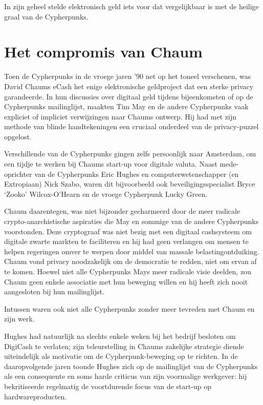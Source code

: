 \documentclass[
  a5paper,
  smalldemyvopaper,11pt,twoside,onecolumn,openright,extrafontsizes,
hidelinks]{memoir}
\begin{document}
In zijn geheel stelde elektronisch geld iets voor dat vergelijkbaar is
met de heilige graal van de Cypherpunks.

\section{Het compromis van Chaum}\label{het-compromis-van-chaum}

Toen de Cypherpunks in de vroege jaren '90 net op het toneel verschenen,
was David Chaums eCash het enige elektronische geldproject dat een
sterke privacy garandeerde. In hun discussies over digitaal geld tijdens
bijeenkomsten of op de Cypherpunks mailinglijst, maakten Tim May en de
andere Cypherpunks vaak expliciet of impliciet verwijzingen naar Chaums
ontwerp. Hij had met zijn methode van blinde handtekeningen een cruciaal
onderdeel van de privacy-puzzel opgelost.

Verschillende van de Cypherpunks gingen zelfs persoonlijk naar
Amsterdam, om een tijdje te werken bij Chaums start-up voor digitale
valuta. Naast mede-oprichter van de Cypherpunks Eric Hughes en
computerwetenschapper (en Extropiaan) Nick Szabo, waren dit bijvoorbeeld
ook beveiligingsspecialist Bryce `Zooko' Wilcox-O'Hearn en de vroege
Cypherpunk Lucky Green.

Chaum daarentegen, was niet bijzonder gecharmeerd door de meer radicale
crypto-anarchistische aspiraties die May en sommige van de andere
Cypherpunks voorstonden. Deze cryptograaf was niet bezig met een
digitaal cashsysteem om digitale zwarte markten te faciliteren en hij
had geen verlangen om mensen te helpen regeringen omver te werpen door
middel van massale belastingontduiking. Chaum vond privacy noodzakelijk
om de democratie te redden, niet om ervan af te komen. Hoewel niet alle
Cypherpunks Mays meer radicale visie deelden, zou Chaum geen enkele
associatie met hun beweging willen en hij heeft zich nooit aangesloten
bij hun mailinglijst.

Intussen waren ook niet alle Cypherpunks zonder meer tevreden met Chaum
en zijn werk.

Hughes had natuurlijk na slechts enkele weken bij het bedrijf besloten
om DigiCash te verlaten; zijn teleurstelling in Chaums zakelijke
strategie diende uiteindelijk als motivatie om de Cypherpunk-beweging op
te richten. In de daaropvolgende jaren toonde Hughes zich op de
mailinglijst van de Cypherpunks als een consequente en soms harde
criticus van zijn voormalige werkgever: hij bekritiseerde regelmatig de
voortdurende focus van de start-up op hardwareproducten.
\end{document}
